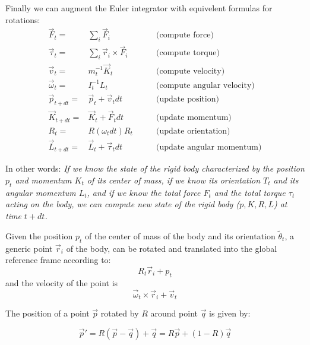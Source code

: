 \documentclass[12pt]{article}
\begin{document}
Finally we can augment the Euler integrator with equivelent formulas for rotations:
\begin{eqnarray}
\vec F_t =& \sum_i \vec F_i & \qquad \textrm{(compute force)} \\
\vec \tau_t =& \sum_i \vec r_i \times \vec F_i & \qquad \textrm{(compute torque)}\\
\vec v_{t} =& m_t^{-1}\vec K_{t} & \qquad \textrm{(compute velocity)}\\
\vec \omega_t =& I_t^{-1} L_t & \qquad \textrm{(compute angular velocity)}\\
\vec p_{t+dt} =& \vec p_t + \vec v_t dt & \qquad \textrm{(update position)}\\
\vec K_{t+dt} =& \vec K_t + \vec F_t dt & \qquad \textrm{(update momentum)}\\
R_t = & R(\omega_t dt) R_t & \qquad \textrm{(update orientation)}\\
\vec L_{t+dt} =& \vec L_t + \vec \tau_t dt & \qquad \textrm{(update angular momentum)}
\label{euler22}
\end{eqnarray}

In other words: {\it If we know the state of the rigid body characterized by the position $p_t$ and momentum $K_t$ of its center of mass, if we know its orientation $T_t$ and its angular momentum $L_t$, and if we know the total force $F_t$ and the total torque $\tau_t$ acting on the body, we can compute new state of the rigid body ($p,K,R,L$) at time $t+dt$.}

Given the position $p_t$ of the center of mass of the body and its orientation $\tilde \theta_t$, a generic point $\vec r_i$ of the body, can be rotated and translated into the global reference frame according to:
\begin{equation}
R_t \vec r_i + p_t
\end{equation}
and the velocity of the point is
\begin{equation}
\vec \omega_t \times \vec r_i + \vec v_t
\end{equation}


The position of a point $\vec p$ rotated by $R$ around point $\vec q$ is given by:

\begin{equation}
\vec p' = R(\vec p-\vec q)+\vec q = R \vec p + (1-R)\vec q
\end{equation}
\end{document}
